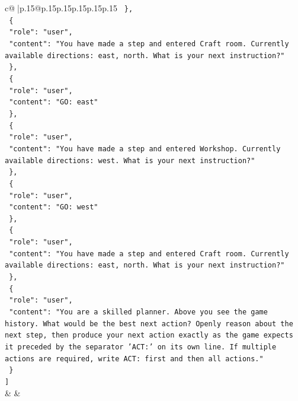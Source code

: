 \documentclass{article}
\begin{document}
{\begin{supertabular}{c@{$\;$}|p{.15\linewidth}@{}p{.15\linewidth}p{.15\linewidth}p{.15\linewidth}p{.15\linewidth}p{.15\linewidth}}
{{{\texttt{  \},} \\
\texttt{  \{} \\
\texttt{    "role": "user",} \\
\texttt{    "content": "You have made a step and entered Craft room. Currently available directions: east, north. What is your next instruction?"} \\
\texttt{  \},} \\
\texttt{  \{} \\
\texttt{    "role": "user",} \\
\texttt{    "content": "GO: east"} \\
\texttt{  \},} \\
\texttt{  \{} \\
\texttt{    "role": "user",} \\
\texttt{    "content": "You have made a step and entered Workshop. Currently available directions: west. What is your next instruction?"} \\
\texttt{  \},} \\
\texttt{  \{} \\
\texttt{    "role": "user",} \\
\texttt{    "content": "GO: west"} \\
\texttt{  \},} \\
\texttt{  \{} \\
\texttt{    "role": "user",} \\
\texttt{    "content": "You have made a step and entered Craft room. Currently available directions: east, north. What is your next instruction?"} \\
\texttt{  \},} \\
\texttt{  \{} \\
\texttt{    "role": "user",} \\
\texttt{    "content": "You are a skilled planner. Above you see the game history. What would be the best next action? Openly reason about the next step, then produce your next action exactly as the game expects it preceded by the separator 'ACT:' on its own line. If multiple actions are required, write ACT: first and then all actions."} \\
\texttt{  \}} \\
\texttt{{]}} \\
            }
        }
    }
    & & \\ \\


\end{supertabular}}
\end{document}
